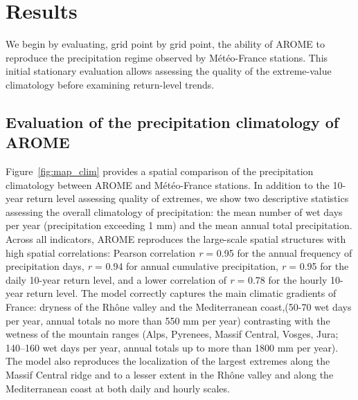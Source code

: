 \documentclass[french,a4paper,DIV=11,numbers=noendperiod]{scrartcl}
\begin{document}
%

\section{Results}\label{results}

We begin by evaluating, grid point by grid point, the ability of AROME
to reproduce the precipitation regime observed by Météo-France stations.
This initial stationary evaluation allows assessing the quality of the extreme-value climatology before examining return-level trends.

\subsection{Evaluation of the precipitation climatology of AROME}
\label{evaluation-of-the-precipitation-climatology-by-arome}

Figure~\ref{fig:map_clim} provides a spatial comparison of the precipitation climatology between AROME and Météo-France stations. In addition to the 10-year return level assessing quality of extremes, we show two descriptive statistics assessing the overall climatology of precipitation: the mean number of wet days per year (precipitation exceeding 1 mm) and the mean annual total precipitation. Across all indicators, AROME reproduces the large-scale spatial structures with high spatial correlations: Pearson correlation \emph{r} = 0.95 for the annual frequency of precipitation days, \emph{r} = 0.94 for annual cumulative precipitation, \emph{r} = 0.95 for the daily 10-year return level, and a lower correlation of \emph{r} = 0.78 for the hourly 10-year return level. The model correctly captures the main climatic gradients of France: dryness of the Rhône valley and the Mediterranean coast,(50-70 wet days per year, annual totals no more than 550 mm per year) contrasting with the wetness of the mountain ranges (Alps, Pyrenees, Massif Central, Vosges, Jura; 140--160 wet days per year, annual totals up to more than 1800 mm per year). The model also reproduces the localization of the largest extremes along the Massif Central ridge and to a lesser extent in the Rhône valley and along the Mediterranean coast at both daily and hourly scales.
\end{document}
